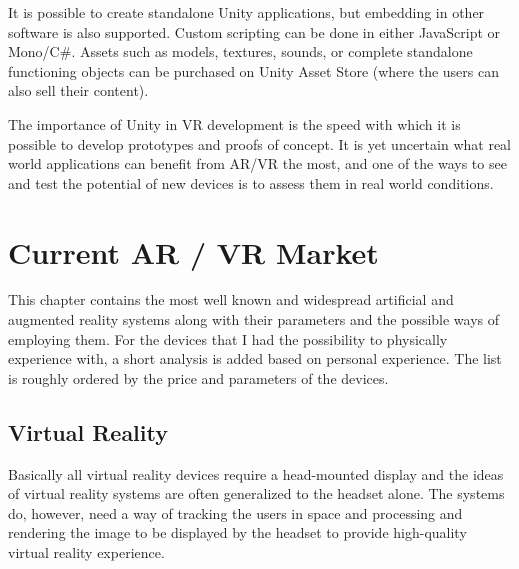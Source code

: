 \documentclass[12pt, a4paper]{article}
\begin{document}
It is possible to create standalone Unity applications, but embedding in other software is also supported. Custom scripting can be done in either JavaScript or Mono/C\#. Assets such as models, textures, sounds, or complete standalone functioning objects can be purchased on Unity Asset Store (where the users can also sell their content).

The importance of Unity in VR development is the speed with which it is possible to develop prototypes and proofs of concept. It is yet uncertain what real world applications can benefit from AR/VR the most, and one of the ways to see and test the potential of new devices is to assess them in real world conditions.

\section{Current AR / VR Market}
This chapter contains the most well known and widespread artificial and augmented reality systems along with their parameters and the possible ways of employing them. For the devices that I had the possibility to physically experience with, a short analysis is added based on personal experience. The list is roughly ordered by the price and parameters of the devices.

\subsection{Virtual Reality}
Basically all virtual reality devices require a head-mounted display and the ideas of virtual reality systems are often generalized to the headset alone. The systems do, however, need a way of tracking the users in space and processing and rendering the image to be displayed by the headset to provide high-quality virtual reality experience.
\end{document}
